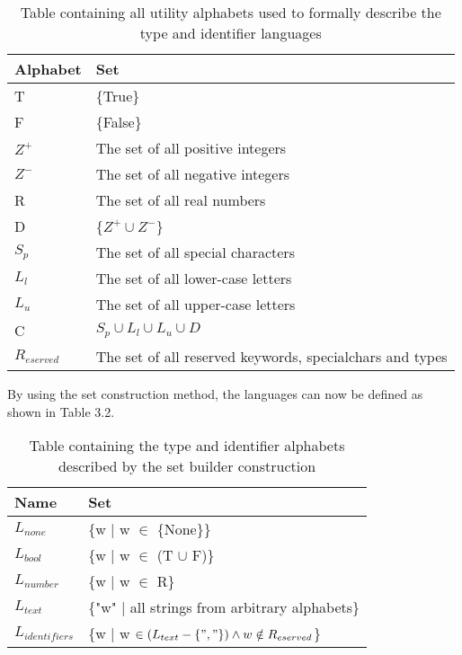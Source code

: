 \begin{table}[!htb]
	\centering
	\begin{tabular}{|l|l|}
		\hline
		\textbf{Alphabet} & \textbf{Set}                            \\ \hline
		T                 & \{True\}                                \\ \hline
		F                 & \{False\}                               \\ \hline
		$Z^+$             & The set of all positive integers        \\ \hline
		$Z^-$             & The set of all negative integers        \\ \hline
		R                 & The set of all real numbers             \\ \hline
		D                 & \{$Z^+ \cup Z^-$\}                      \\ \hline
		$S_p$             & The set of all special characters      \\ \hline
		$L_l$             & The set of all lower-case letters       \\ \hline
		$L_u$             & The set of all upper-case letters       \\ \hline
		C                 & $S_p \cup L_l \cup L_u \cup D$          \\ \hline
		$R_{eserved}$     & The set of all reserved keywords, specialchars and types \\ \hline
	\end{tabular}
	\caption{Table containing all utility alphabets used to formally describe the type and identifier languages}
\end{table}

By using the set construction method, the languages can now be defined as shown in Table 3.2.

\begin{table}[!htb]
	\centering
	\begin{tabular}{|l|l|}
		\hline
		\textbf{Name}     & \textbf{Set}                                    \\ \hline
		$L_{none}$        & \{w | w $\in$ \{None\}\}                        \\ \hline
		$L_{bool}$        & \{w | w $\in$ (T $\cup$ F)\}                    \\ \hline
		$L_{number}$      & \{w | w $\in$ R\}                               \\ \hline
		$L_{text}$        & \{"w" | all strings from arbitrary alphabets\}  \\ \hline
		$L_{identifiers}$ & \{w | w $\in (L_{text} - \{", "\}) \wedge w \notin R_{eserved}$\} \\ \hline
	\end{tabular}
	\caption{Table containing the type and identifier alphabets described by the set builder construction}
\end{table}

